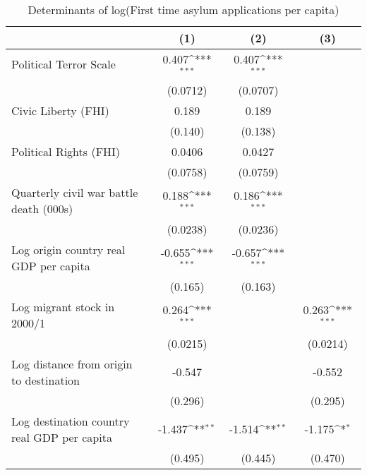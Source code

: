 \begin{table}[htbp]\centering
\def\sym#1{\ifmmode^{#1}\else\(^{#1}\)\fi}
\caption{Determinants of log(First time asylum applications per capita)}
\begin{tabular}{l*{3}{c}}
\hline\hline
                    &\multicolumn{1}{c}{(1)}         &\multicolumn{1}{c}{(2)}         &\multicolumn{1}{c}{(3)}         \\
\hline
Political Terror Scale&       0.407\sym{***}&       0.407\sym{***}&                     \\
                    &    (0.0712)         &    (0.0707)         &                     \\
[1em]
Civic Liberty (FHI) &       0.189         &       0.189         &                     \\
                    &     (0.140)         &     (0.138)         &                     \\
[1em]
Political Rights (FHI)&      0.0406         &      0.0427         &                     \\
                    &    (0.0758)         &    (0.0759)         &                     \\
[1em]
Quarterly civil war battle death (000s)&       0.188\sym{***}&       0.186\sym{***}&                     \\
                    &    (0.0238)         &    (0.0236)         &                     \\
[1em]
Log origin country real GDP per capita&      -0.655\sym{***}&      -0.657\sym{***}&                     \\
                    &     (0.165)         &     (0.163)         &                     \\
[1em]
Log migrant stock in 2000/1&       0.264\sym{***}&                     &       0.263\sym{***}\\
                    &    (0.0215)         &                     &    (0.0214)         \\
[1em]
Log distance from origin to destination&      -0.547         &                     &      -0.552         \\
                    &     (0.296)         &                     &     (0.295)         \\
[1em]
Log destination country real GDP per capita&      -1.437\sym{**} &      -1.514\sym{**} &      -1.175\sym{*}  \\
                    &     (0.495)         &     (0.445)         &     (0.470)         \\

\end{tabular}
\end{table}
